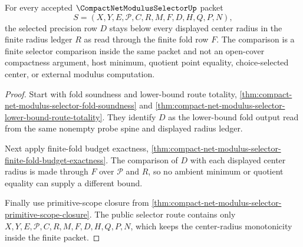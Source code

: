\begin{theorem}
\label{thm:compact-net-modulus-selector-center-radius-monotonicity}
For every accepted $\CompactNetModulusSelectorUp$ packet
$$
S=(X,Y,E,\mathcal{P},C,R,M,F,D,H,Q,P,N),
$$
the selected precision row $D$ stays below every displayed center radius in the finite radius ledger $R$ as read through the finite fold row $F$. The comparison is a finite selector comparison inside the same packet and not an open-cover compactness argument, host minimum, quotient point equality, choice-selected center, or external modulus computation.
\end{theorem}
\begin{proof}
Start with fold soundness and lower-bound route totality, \autoref{thm:compact-net-modulus-selector-fold-soundness} and \autoref{thm:compact-net-modulus-selector-lower-bound-route-totality}. They identify $D$ as the lower-bound fold output read from the same nonempty probe spine and displayed radius ledger.

Next apply finite-fold budget exactness, \autoref{thm:compact-net-modulus-selector-finite-fold-budget-exactness}. The comparison of $D$ with each displayed center radius is made through $F$ over $\mathcal{P}$ and $R$, so no ambient minimum or quotient equality can supply a different bound.

Finally use primitive-scope closure from \autoref{thm:compact-net-modulus-selector-primitive-scope-closure}. The public selector route contains only $X,Y,E,\mathcal{P},C,R,M,F,D,H,Q,P,N$, which keeps the center-radius monotonicity inside the finite packet.
\end{proof}

